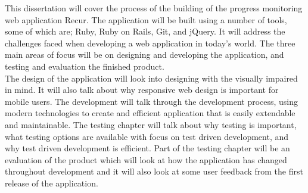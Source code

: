 This dissertation will cover the process of the building of the progress monitoring web application Recur. The application will be built using a number of tools, some of which are; Ruby, Ruby on Rails, Git, and jQuery. It will address the challenges faced when developing a web application in today's world. The three main areas of focus will be on designing and developing the application, and testing and evaluation the finished product.\\

The design of the application will look into designing with the visually impaired in mind. It will also talk about why responsive web design is important for mobile users. The development will talk through the development process, using modern technologies to create and efficient application that is easily extendable and maintainable. The testing chapter will talk about why testing is important, what testing options are available with focus on test driven development, and why test driven development is efficient. Part of the testing chapter will be an evaluation of the product which will look at how the application has changed throughout development and it will also look at some user feedback from the first release of the application.